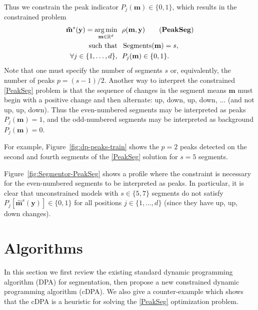 \documentclass{article}
\DeclareMathOperator*{\argmin}{arg\,min}
\DeclareMathOperator*{\Segments}{Segments}
\newcommand{\RR}{\mathbb R}
\begin{document}

Thus we constrain the peak indicator $P_j(\mathbf
m)\in\{0, 1\}$, which results
in the constrained problem
\begin{align*}
  \label{PeakSeg}
  \mathbf{\tilde m}^s(\mathbf y)  =
    \argmin_{\mathbf m\in\RR^{d}} &\ \ 
    \rho(\mathbf m, \mathbf y) 
    \tag{\textbf{PeakSeg}}
\\
    \text{such that} &\ \  \Segments(\mathbf m)=s,  \\
     \forall j\in\{1, \dots, d\}, &\ \ P_j(\mathbf m) \in\{0, 1\}.
\end{align*}
Note that one must specify the number of segments $s$ or,
equivalently, the number of peaks $p=(s-1)/2$. Another way to
interpret the constrained \ref{PeakSeg} problem is that the sequence
of changes in the segment means $\mathbf m$ must begin with a positive
change and then alternate: up, down, up, down, ... (and not up, up,
down). Thus the even-numbered segments may be interpreted as peaks
$P_j(\mathbf m)=1$, and the odd-numbered segments may be interpreted
as background $P_j(\mathbf m)=0$.

For example, Figure~\ref{fig:dp-peaks-train} shows the $p=2$ peaks
detected on the second and fourth segments of the \ref{PeakSeg}
solution for $s=5$ segments.

Figure~\ref{fig:Segmentor-PeakSeg} shows a profile where the constraint is
necessary for the even-numbered segments to be interpreted as
peaks. In particular, it is clear that unconstrained models with
$s\in\{5, 7\}$ segments do not satisfy $P_j[\mathbf{\hat m}^s(\mathbf
y)]\in\{0, 1\}$ for all positions $j\in\{1,\dots, d\}$ (since they
have up, up, down changes).

\section{Algorithms}
\label{sec:algorithms}

In this section we first review the existing standard dynamic
programming algorithm (DPA) for segmentation, then propose a new
constrained dynamic programming algorithm (cDPA). We also give a
counter-example which shows that the cDPA is a heuristic for solving
the \ref{PeakSeg} optimization problem.
\end{document}
